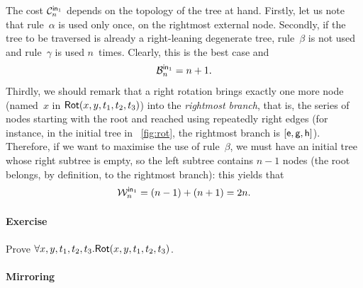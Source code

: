 The cost \(\C{\fun{in}_1}{n}\) depends
on the topology of the tree at hand. Firstly, let us note that
rule~\(\alpha\) is used only once, on the rightmost external
node. Secondly, if the tree to be traversed is already a
right\hyp{}leaning degenerate 
tree, rule~\(\beta\) is not used and rule~\(\gamma\) is used
\(n\)~times. Clearly, this is the best case and
\begin{equation*}
  \B{\fun{in}_1}{n} = n + 1.
  \index{in1@$\B{\fun{in}_1}{n}$}
\end{equation*}
Thirdly, we should remark that a right rotation brings exactly one
more node (named~\(x\) in
\(\pred{Rot}{x,y,t_1,t_2,t_3}\)) into the
\emph{rightmost branch}, that is, the series of
nodes starting with the root and reached using repeatedly right edges
(for instance, in the initial tree in \fig~\vref{fig:rot}, the
rightmost branch is \([\fun{e}, \fun{g},
  \fun{h}]\)). Therefore, if we want to maximise the use of
rule~\(\beta\), we must have an initial tree whose right subtree is
empty, so the left subtree contains \(n-1\) nodes (the root belongs,
by definition, to the rightmost branch): this yields that
\begin{equation*}
  \W{\fun{in}_1}{n} = (n-1) + (n+1) = 2n.
  \index{in1@$\W{\fun{in}_1}{n}$}
  \index{binary tree!rotation|)}
\end{equation*}

\paragraph{Exercise}

Prove \(\forall x,y,t_1,t_2,t_3.\pred{Rot}{x,y,t_1,t_2,t_3}\).

\paragraph{Mirroring}

